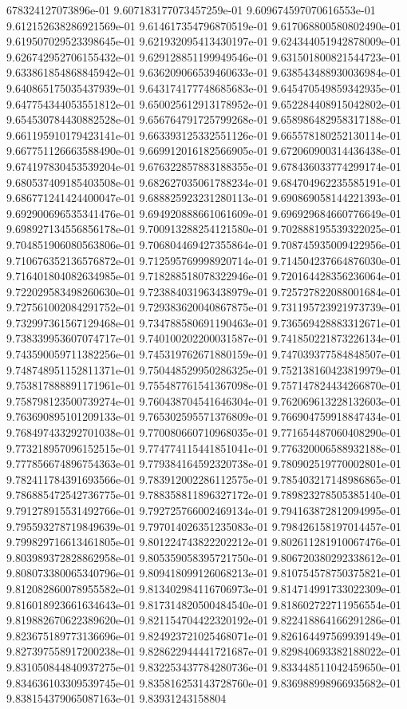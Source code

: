 678324127073896e-01	9.607183177073457259e-01	9.609674597070616553e-01	9.612152638286921569e-01	9.614617354796870519e-01	9.617068800580802490e-01	9.619507029523398645e-01	9.621932095413430197e-01	9.624344051942878009e-01	9.626742952706155432e-01	9.629128851199949546e-01	9.631501800821544723e-01	9.633861854868845942e-01	9.636209066539460633e-01	9.638543488930036984e-01	9.640865175035437939e-01	9.643174177748685683e-01	9.645470549859342935e-01	9.647754344053551812e-01	9.650025612913178952e-01	9.652284408915042802e-01	9.654530784430882528e-01	9.656764791725799268e-01	9.658986482958317188e-01	9.661195910179423141e-01	9.663393125332551126e-01	9.665578180252130114e-01	9.667751126663588490e-01	9.669912016182566905e-01	9.672060900314436438e-01	9.674197830453539204e-01	9.676322857883188355e-01	9.678436033774299174e-01	9.680537409185403508e-01	9.682627035061788234e-01	9.684704962235585191e-01	9.686771241424400047e-01	9.688825923231280113e-01	9.690869058144221393e-01	9.692900696535341476e-01	9.694920888661061609e-01	9.696929684660776649e-01	9.698927134556856178e-01	9.700913288254121580e-01	9.702888195539322025e-01	9.704851906080563806e-01	9.706804469427355864e-01	9.708745935009422956e-01	9.710676352136576872e-01	9.712595769998920714e-01	9.714504237664876030e-01	9.716401804082634985e-01	9.718288518078322946e-01	9.720164428356236064e-01	9.722029583498260630e-01	9.723884031963438979e-01	9.725727822088001684e-01	9.727561002084291752e-01	9.729383620040867875e-01	9.731195723921973739e-01	9.732997361567129468e-01	9.734788580691190463e-01	9.736569428883312671e-01	9.738339953607074717e-01	9.740100202200031587e-01	9.741850221873226134e-01	9.743590059711382256e-01	9.745319762671880159e-01	9.747039377584848507e-01	9.748748951152811371e-01	9.750448529950286325e-01	9.752138160423819979e-01	9.753817888891171961e-01	9.755487761541367098e-01	9.757147824434266870e-01	9.758798123500739274e-01	9.760438704541646304e-01	9.762069613228132603e-01	9.763690895101209133e-01	9.765302595571376809e-01	9.766904759918847434e-01	9.768497433292701038e-01	9.770080660710968035e-01	9.771654487060408290e-01	9.773218957096152515e-01	9.774774115441851041e-01	9.776320006588932188e-01	9.777856674896754363e-01	9.779384164592320738e-01	9.780902519770002801e-01	9.782411784391693566e-01	9.783912002286112575e-01	9.785403217148986865e-01	9.786885472542736775e-01	9.788358811896327172e-01	9.789823278505385140e-01	9.791278915531492766e-01	9.792725766002469134e-01	9.794163872812094995e-01	9.795593278719849639e-01	9.797014026351235083e-01	9.798426158197014457e-01	9.799829716613461805e-01	9.801224743822202212e-01	9.802611281910067476e-01	9.803989372828862958e-01	9.805359058395721750e-01	9.806720380292338612e-01	9.808073380065340796e-01	9.809418099126068213e-01	9.810754578750375821e-01	9.812082860078955582e-01	9.813402984116706973e-01	9.814714991733022309e-01	9.816018923661634643e-01	9.817314820500484540e-01	9.818602722711956554e-01	9.819882670622389620e-01	9.821154704422320192e-01	9.822418864166291286e-01	9.823675189773136696e-01	9.824923721025468071e-01	9.826164497569939149e-01	9.827397558917200238e-01	9.828622944441721687e-01	9.829840693382188022e-01	9.831050844840937275e-01	9.832253437784280736e-01	9.833448511042459650e-01	9.834636103309539745e-01	9.835816253143728760e-01	9.836988998966935682e-01	9.838154379065087163e-01	9.83931243158804